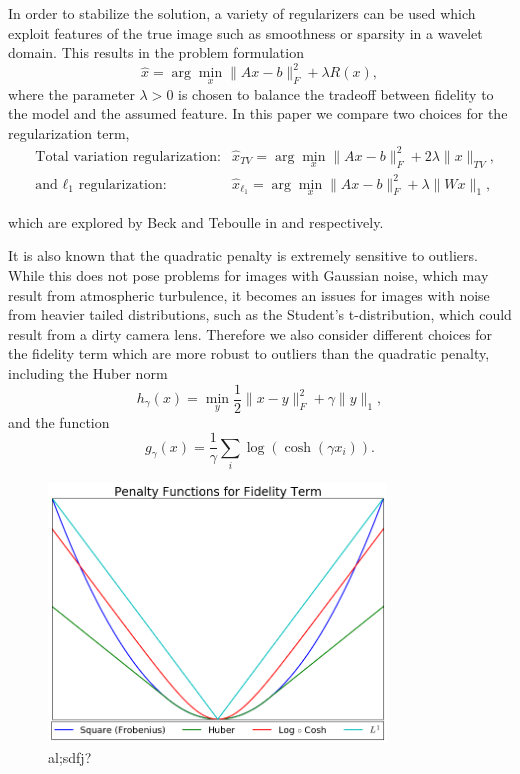 \documentclass[10pt,a4paper]{article}
\begin{document}
In order to stabilize the solution, a variety of regularizers can be used which exploit features of the true image such as smoothness or sparsity in a wavelet domain. This results in the problem formulation
\begin{equation}
\hat{x} = \arg\min_{x} \| Ax - b \|_F^2 + \lambda R(x),
\end{equation}
where the parameter $\lambda > 0$ is chosen to balance the tradeoff between fidelity to the model and the assumed feature. In this paper we compare two choices for the regularization term, 
\begin{align}
&\text{Total variation regularization:} &\hat{x}_{TV} = \arg\min_x \| Ax - b \|_F^2 + 2\lambda \| x \|_{TV} , \\
&\text{and } \ell_1 \text{ regularization:} &\hat{x}_{\ell_1} = \arg\min_x \| Ax - b \|_F^2 + \lambda \| Wx \|_1  ,
\end{align}

which are explored by Beck and Teboulle in \cite{TV} and \cite{FISTA} respectively.

It is also known that the quadratic penalty is extremely sensitive to outliers. While this does not pose problems for images with Gaussian noise, which may result from atmospheric turbulence, it becomes an issues for images with noise from heavier tailed distributions, such as the Student's t-distribution, which could result from a dirty camera lens. Therefore we also consider different choices for the fidelity term which are more robust to outliers than the quadratic penalty, including the Huber norm
\begin{equation} \label{huber}
h_{\gamma}(x) = \min_y \frac{1}{2} \| x - y \|_F^2 + \gamma \| y \|_1,
\end{equation}
and the function
\begin{equation} \label{log_cosh}
g_{\gamma}(x) = \frac{1}{\gamma} \sum_i \log\left(\cosh\left(\gamma x_i\right)\right).
\end{equation}

\begin{figure}[H]
\centering
\includegraphics[width=0.8\textwidth]{../figures/penalty_functions.png} 
\caption{al;sdfj?}
\end{figure}
\end{document}
